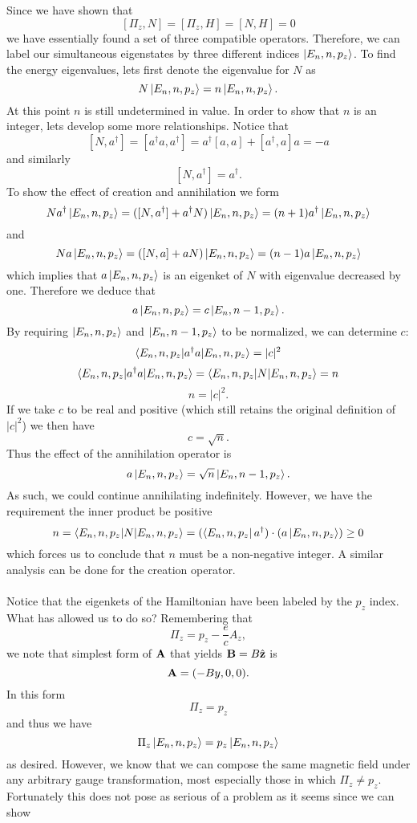 \documentclass[11pt,letterpaper]{article}
\begin{document}
		Since we have shown that
		\[
			[\Pi_z,N] = [\Pi_z,H] = [N,H] = 0
		\]
		we have essentially found a set of three compatible operators. Therefore, we can label our simultaneous eigenstates by three 
		different indices $\ket{E_n,n,p_z}$. To find the energy eigenvalues, lets first denote the eigenvalue for $N$ as
		\[
			N\ket{E_n,n,p_z} = n\ket{E_n,n,p_z}.
		\]
		At this point $n$ is still undetermined in value. In order to show that $n$ is an integer, lets develop some more relationships. Notice
		that
		\[
			[N,a^\dag] = [a^\dag a,a^\dag] = a^\dag[a,a]+[a^\dag,a]a = -a
		\]
		and similarly
		\[
			[N,a^\dag] = a^\dag.
		\]
		To show the effect of creation and annihilation we form
		\[
			Na^\dag\ket{E_n,n,p_z} = ([N,a^\dag]+a^\dag N)\ket{E_n,n,p_z} = (n+1)a^\dag \ket{E_n,n,p_z}
		\]
		and
		\[
			Na\ket{E_n,n,p_z} = ([N,a]+a N)\ket{E_n,n,p_z} = (n-1)a\ket{E_n,n,p_z}
		\]
		which implies that $a\ket{E_n,n,p_z}$ is an eigenket of $N$ with eigenvalue decreased by one. Therefore we deduce that
		\[
			a\ket{E_n,n,p_z} = c\ket{E_n,n-1,p_z}.
		\]
		By requiring $\ket{E_n,n,p_z}$ and $\ket{E_n,n-1,p_z}$ to be normalized, we can determine $c$:
		\[
			\braket{E_n,n,p_z|a^\dag a|E_n,n,p_z} = |c|^2
		\]
		\[
			\braket{E_n,n,p_z|a^\dag a|E_n,n,p_z} = \braket{E_n,n,p_z|N|E_n,n,p_z} = n 
		\]
		\[	
			n = |c|^2.
		\]
		If we take $c$ to be real and positive (which still retains the original definition of $|c|^2$) we then have
		\[
			c=\sqrt{n}. 
		\]
		Thus the effect of the annihilation operator is
		\[
			a\ket{E_n,n,p_z} = \sqrt{n}\ket{E_n,n-1,p_z}.
		\]
		As such, we could continue annihilating indefinitely. However, we have the requirement the inner product be positive
		\[
			n=\braket{E_n,n,p_z|N|E_n,n,p_z}= (\bra{E_n,n,p_z}a^\dag)\cdot(a\ket{E_n,n,p_z}) \ge 0
		\]
		which forces us to conclude that $n$ must be a non-negative integer. A similar analysis can be done for the creation operator. 
		\\
		\\
		Notice that the eigenkets of the Hamiltonian have been labeled by the $p_z$ index. What has allowed us to do so? Remembering 
		that
		\[
			\Pi_z = p_z-\frac{e}{c}A_z,
		\]
		we note that simplest form of $\mathbf{A}$ that yields $\mathbf{B} = B\hat{\mathbf{z}}$ is 
		\[
			\mathbf{A} = (-By,0,0).
		\]
		In this form
		\[
			\Pi_z = p_z
		\] 
		and thus we have
		\[
			\Pi_z \ket{E_n,n,p_z} = p_z\ket{E_n,n,p_z}
		\]
		as desired. However, we know that we can compose the same magnetic field under any arbitrary gauge transformation, most 
		especially those in which $\Pi_z \ne p_z$. Fortunately this does not pose as serious of a problem as it seems since we can show
\end{document}
